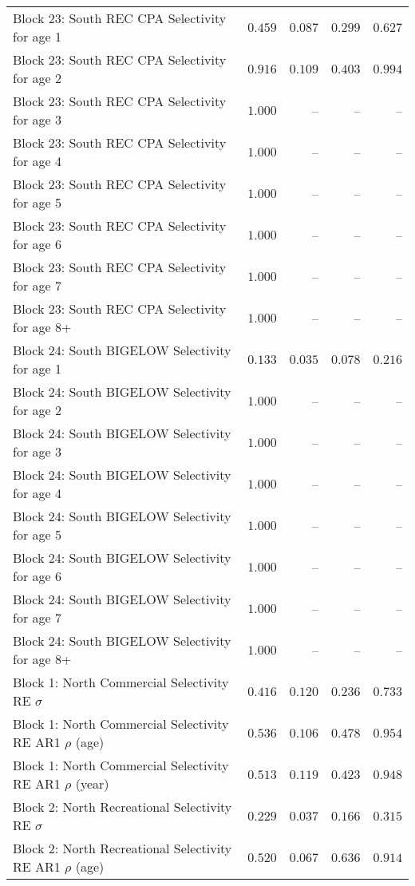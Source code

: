 \documentclass[
]{article}
\begin{document}
\begin{landscape}
\begin{longtable}[t]{lrrrr}
Block 23: South REC CPA Selectivity for age 1 & $0.459$ & $0.087$ & $0.299$ & $0.627$\\
Block 23: South REC CPA Selectivity for age 2 & $0.916$ & $0.109$ & $0.403$ & $0.994$\\
\addlinespace
Block 23: South REC CPA Selectivity for age 3 & $1.000$ & -- & -- & --\\
Block 23: South REC CPA Selectivity for age 4 & $1.000$ & -- & -- & --\\
Block 23: South REC CPA Selectivity for age 5 & $1.000$ & -- & -- & --\\
Block 23: South REC CPA Selectivity for age 6 & $1.000$ & -- & -- & --\\
Block 23: South REC CPA Selectivity for age 7 & $1.000$ & -- & -- & --\\
\addlinespace
Block 23: South REC CPA Selectivity for age 8+ & $1.000$ & -- & -- & --\\
Block 24: South BIGELOW Selectivity for age 1 & $0.133$ & $0.035$ & $0.078$ & $0.216$\\
Block 24: South BIGELOW Selectivity for age 2 & $1.000$ & -- & -- & --\\
Block 24: South BIGELOW Selectivity for age 3 & $1.000$ & -- & -- & --\\
Block 24: South BIGELOW Selectivity for age 4 & $1.000$ & -- & -- & --\\
\addlinespace
Block 24: South BIGELOW Selectivity for age 5 & $1.000$ & -- & -- & --\\
Block 24: South BIGELOW Selectivity for age 6 & $1.000$ & -- & -- & --\\
Block 24: South BIGELOW Selectivity for age 7 & $1.000$ & -- & -- & --\\
Block 24: South BIGELOW Selectivity for age 8+ & $1.000$ & -- & -- & --\\
Block 1: North Commercial Selectivity RE $\sigma$ & $0.416$ & $0.120$ & $0.236$ & $0.733$\\
\addlinespace
Block 1: North Commercial Selectivity RE AR1 $\rho$ (age) & $0.536$ & $0.106$ & $0.478$ & $0.954$\\
Block 1: North Commercial Selectivity RE AR1 $\rho$ (year) & $0.513$ & $0.119$ & $0.423$ & $0.948$\\
Block 2: North Recreational Selectivity RE $\sigma$ & $0.229$ & $0.037$ & $0.166$ & $0.315$\\
Block 2: North Recreational Selectivity RE AR1 $\rho$ (age) & $0.520$ & $0.067$ & $0.636$ & $0.914$\\

\end{longtable}
\end{landscape}
\end{document}
